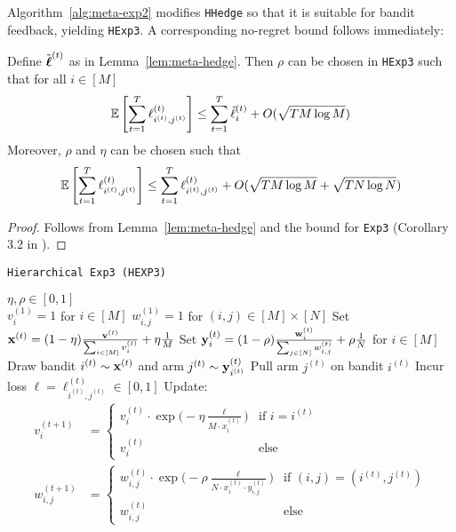 Algorithm~\ref{alg:meta-exp2} modifies \texttt{HHedge} so that it is suitable for bandit feedback, yielding \texttt{HExp3}. A corresponding no-regret bound follows immediately:

\begin{lem}\label{lem:meta-exp}
	Define $\tilde{\boldsymbol\ell}^{(t)}$ as in Lemma~\ref{lem:meta-hedge}. Then $\rho$ can be chosen in \texttt{HExp3} such that for all $i\in[M]$
	\begin{equation}
		\operatorname*{\mathbb E}\left[\sum_{t=1}^T\ell^{(t)}_{i^{(t)},j^{(t)}}\right]
		\leq \sum_{t=1}^T \tilde{\ell}^{(t)}_{i}
		+ O(\sqrt{T M\log M})
	\end{equation}
	Moreover, $\rho$ and $\eta$ can be chosen such that
	\begin{equation}
		\operatorname*{\mathbb E}\left[\sum_{t=1}^{T} \ell^{(t)}_{i^{(t)},j^{(t)}}\right]
		\leq \sum_{t=1}^T\ell^{(t)}_{i^{(t)},j^{(t)}}
		+ O(\sqrt{TM \log M} + \sqrt{T N\log N})
	\end{equation}
\end{lem}
\begin{proof}
	Follows from Lemma~\ref{lem:meta-hedge} and the bound for \texttt{Exp3} (Corollary 3.2 in \cite{auer:02b}).
\end{proof}

\begin{algorithm}[tb]
   \caption{\texttt{Hierarchical Exp3 (HEXP3)}}
   \label{alg:meta-exp2}
   \begin{algorithmic}   
       $\eta,\rho\in[0,1]$\\
      \STATE $v^{(1)}_{i}=1$ for $i\in[M]$
   	\STATE $w^{(1)}_{i,j}=1$ for $(i,j)\in[M]\times[N]$
	   \STATE Set ${\mathbf x}^{(t)} = (1-\eta) \frac{{\mathbf v}^{(t)}}{\sum_{i\in[M]} v^{(t)}_{i}} + \eta\frac{1}{M}$
	   \STATE Set ${\mathbf y}^{(t)}_{i} = (1-\rho)\frac{{\mathbf w}^{(t)}_{i}}{\sum_{j\in[N]} w^{(t)}_{i,j}} + \rho\frac{1}{N}$ for $i\in[M]$
	\STATE Draw bandit $i^{(t)}\sim {\mathbf x}^{(t)}$ and arm $j^{(t)}\sim {\mathbf y}^{(t)}_{i^{(t)}}$
	\STATE Pull arm $j^{(t)}$ on bandit $i^{(t)}$
	   \STATE Incur loss $\ell =\ell_{i^{(t)}, j^{(t)}}^{(t)}\in [0,1]$ 
	\STATE Update:
	\begin{align}
		v^{(t+1)}_i & = \begin{cases}
			v^{(t)}_{i}\cdot 
			\exp\big(-\eta \frac{\ell}{M\cdot x_{i}^{(t)}}\big) & \text{if } i=i^{(t)} \\
			v^{(t)}_{i} & \text{else}
		\end{cases}		 
		\\
		w^{(t+1)}_{i,j} & = \begin{cases}
			w^{(t)}_{i,j}\cdot \exp\big(-\rho\frac{\ell}{N\cdot x_i^{(t)}\cdot y_{i,j}^{(t)}}\big) 
			& \text{if }(i,j)=(i^{(t)}, j^{(t)}) \\
			w^{(t)}_{i,j} &\text{else}
		\end{cases}
	\end{align}
   	\ENDFOR
   	\end{algorithmic}
\end{algorithm}


